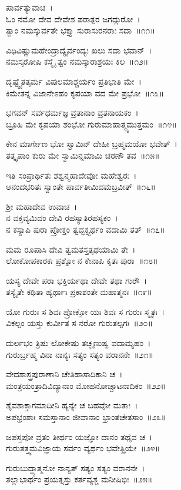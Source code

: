 ಪಾರ್ವತ್ಯುವಾಚ~।\\
ಓಂ ನಮೋ ದೇವ ದೇವೇಶ ಪರಾತ್ಪರ ಜಗದ್ಗುರೋ~।\\
ತ್ವಾಂ ನಮಸ್ಕುರ್ವತೇ ಭಕ್ತ್ಯಾ ಸುರಾಸುರನರಾಃ ಸದಾ~॥೧೧॥

ವಿಧಿವಿಷ್ಣುಮಹೇಂದ್ರಾದ್ಯೈರ್ವಂದ್ಯಃ ಖಲು ಸದಾ ಭವಾನ್~।\\
ನಮಸ್ಕರೋಷಿ ಕಸ್ಮೈ ತ್ವಂ ನಮಸ್ಕಾರಾಶ್ರಯಃ ಕಿಲ~॥೧೨॥

ದೃಷ್ಟ್ವೈತತ್ಕರ್ಮ ವಿಪುಲಮಾಶ್ಚರ್ಯಂ ಪ್ರತಿಭಾತಿ ಮೇ~।\\
ಕಿಮೇತನ್ನ ವಿಜಾನೇಽಹಂ ಕೃಪಯಾ ವದ ಮೇ ಪ್ರಭೋ~॥೧೩॥

ಭಗವನ್ ಸರ್ವಧರ್ಮಜ್ಞ ವ್ರತಾನಾಂ ವ್ರತನಾಯಕಂ~।\\
ಬ್ರೂಹಿ ಮೇ ಕೃಪಯಾ ಶಂಭೋ ಗುರುಮಾಹಾತ್ಮ್ಯಮುತ್ತಮಂ~॥೧೪॥

ಕೇನ ಮಾರ್ಗೇಣ ಭೋ ಸ್ವಾಮಿನ್ ದೇಹೀ ಬ್ರಹ್ಮಮಯೋ ಭವೇತ್~।\\
ತತ್ಕೃಪಾಂ ಕುರು ಮೇ ಸ್ವಾಮಿನ್ನಮಾಮಿ ಚರಣೌ ತವ~॥೧೫॥

ಇತಿ ಸಂಪ್ರಾರ್ಥಿತಃ ಶಶ್ವನ್ಮಹಾದೇವೋ ಮಹೇಶ್ವರಃ~।\\
ಆನಂದಭರಿತಃ ಸ್ವಾಂತೇ ಪಾರ್ವತೀಮಿದಮಬ್ರವೀತ್~॥೧೬॥

ಶ್ರೀ ಮಹಾದೇವ ಉವಾಚ~।\\
ನ ವಕ್ತವ್ಯಮಿದಂ ದೇವಿ ರಹಸ್ಯಾತಿರಹಸ್ಯಕಂ~।\\
ನ ಕಸ್ಯಾಪಿ ಪುರಾ ಪ್ರೋಕ್ತಂ ತ್ವದ್ಭಕ್ತ್ಯರ್ಥಂ ವದಾಮಿ ತತ್~॥೧೭॥

ಮಮ ರೂಪಾಸಿ ದೇವಿ ತ್ವಮತಸ್ತತ್ಕಥಯಾಮಿ ತೇ~।\\
ಲೋಕೋಪಕಾರಕಃ ಪ್ರಶ್ನೋ ನ ಕೇನಾಪಿ ಕೃತಃ ಪುರಾ~॥೧೮॥

ಯಸ್ಯ ದೇವೇ ಪರಾ ಭಕ್ತಿರ್ಯಥಾ ದೇವೇ ತಥಾ ಗುರೌ~।\\
ತಸ್ಯೈತೇ ಕಥಿತಾ ಹ್ಯರ್ಥಾಃ ಪ್ರಕಾಶಂತೇ ಮಹಾತ್ಮನಃ~॥೧೯॥

ಯೋ ಗುರುಃ ಸ ಶಿವಃ ಪ್ರೋಕ್ತೋ ಯಃ ಶಿವಃ ಸ ಗುರುಃ ಸ್ಮೃತಃ~।\\
ವಿಕಲ್ಪಂ ಯಸ್ತು ಕುರ್ವೀತ ಸ ನರೋ ಗುರುತಲ್ಪಗಃ~॥೨೦॥

ದುರ್ಲಭಂ ತ್ರಿಷು ಲೋಕೇಷು ತಚ್ಛೃಣುಷ್ವ ವದಾಮ್ಯಹಂ~।\\
ಗುರುರ್ಬ್ರಹ್ಮ ವಿನಾ ನಾನ್ಯಃ ಸತ್ಯಂ ಸತ್ಯಂ ವರಾನನೇ~॥೨೧॥

ವೇದಶಾಸ್ತ್ರಪುರಾಣಾನಿ ಚೇತಿಹಾಸಾದಿಕಾನಿ ಚ~।\\
ಮಂತ್ರಯಂತ್ರಾದಿವಿದ್ಯಾನಾಂ ಮೋಹನೋಚ್ಚಾಟನಾದಿಕಂ~॥೨೨॥

ಶೈವಶಾಕ್ತಾಗಮಾದೀನಿ ಹ್ಯನ್ಯೇ ಚ ಬಹವೋ ಮತಾಃ~।\\
ಅಪಭ್ರಂಶಾಃ ಸಮಸ್ತಾನಾಂ ಜೀವಾನಾಂ ಭ್ರಾಂತಚೇತಸಾಂ~॥೨೩॥

ಜಪಸ್ತಪೋ ವ್ರತಂ ತೀರ್ಥಂ ಯಜ್ಞೋ ದಾನಂ ತಥೈವ ಚ~।\\
ಗುರುತತ್ತ್ವಮವಿಜ್ಞಾಯ ಸರ್ವಂ ವ್ಯರ್ಥಂ ಭವೇತ್ಪ್ರಿಯೇ~॥೨೪॥

ಗುರುಬುದ್ಧ್ಯಾತ್ಮನೋ ನಾನ್ಯತ್ ಸತ್ಯಂ ಸತ್ಯಂ ವರಾನನೇ~।\\
ತಲ್ಲಾಭಾರ್ಥಂ ಪ್ರಯತ್ನಸ್ತು ಕರ್ತವ್ಯಶ್ಚ ಮನೀಷಿಭಿಃ~॥೨೫॥

